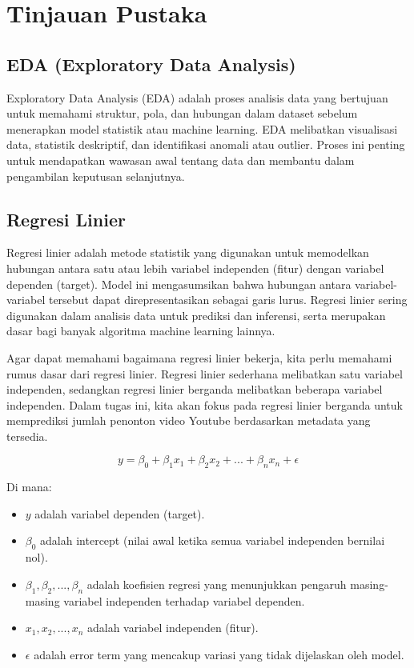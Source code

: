 \section{Tinjauan Pustaka}

\subsection{EDA (Exploratory Data Analysis)}
Exploratory Data Analysis (EDA) adalah proses analisis data yang bertujuan untuk memahami struktur, pola, dan hubungan dalam dataset sebelum menerapkan model statistik atau machine learning. EDA melibatkan visualisasi data, statistik deskriptif, dan identifikasi anomali atau outlier. Proses ini penting untuk mendapatkan wawasan awal tentang data dan membantu dalam pengambilan keputusan selanjutnya.

\subsection{Regresi Linier}
Regresi linier adalah metode statistik yang digunakan untuk memodelkan hubungan antara satu atau lebih variabel independen (fitur) dengan variabel dependen (target). Model ini mengasumsikan bahwa hubungan antara variabel-variabel tersebut dapat direpresentasikan sebagai garis lurus. Regresi linier sering digunakan dalam analisis data untuk prediksi dan inferensi, serta merupakan dasar bagi banyak algoritma machine learning lainnya.

Agar dapat memahami bagaimana regresi linier bekerja, kita perlu memahami rumus dasar dari regresi linier. Regresi linier sederhana melibatkan satu variabel independen, sedangkan regresi linier berganda melibatkan beberapa variabel independen. Dalam tugas ini, kita akan fokus pada regresi linier berganda untuk memprediksi jumlah penonton video Youtube berdasarkan metadata yang tersedia.

\begin{equation}
    y = \beta_0 + \beta_1 x_1 + \beta_2 x_2 + ... + \beta_n x_n + \epsilon
\end{equation}

Di mana:
\begin{itemize}
    \item $y$ adalah variabel dependen (target).
    \item $\beta_0$ adalah intercept (nilai awal ketika semua variabel independen bernilai nol).
    \item $\beta_1, \beta_2, ..., \beta_n$ adalah koefisien regresi yang menunjukkan pengaruh masing-masing variabel independen terhadap variabel dependen.
    \item $x_1, x_2, ..., x_n$ adalah variabel independen (fitur).
    \item $\epsilon$ adalah error term yang mencakup variasi yang tidak dijelaskan oleh model.
\end{itemize}

